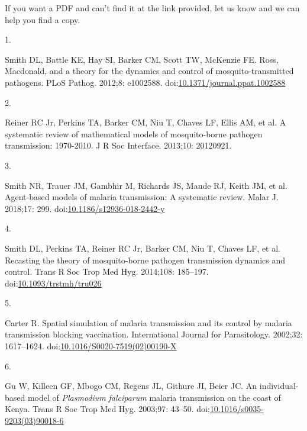 \documentclass[
]{book}
\newlength{\cslhangindent}
\newlength{\csllabelwidth}
\newlength{\cslentryspacingunit} %
\newenvironment{CSLReferences}[2] %
 {%
  \setlength{\parindent}{0pt}
  \ifodd #1
  \let\oldpar\par
  \def\par{\hangindent=\cslhangindent\oldpar}
  \fi
  \setlength{\parskip}{#2\cslentryspacingunit}
 }%
 {}
\newcommand{\CSLLeftMargin}[1]{\parbox[t]{\csllabelwidth}{#1}}
\newcommand{\CSLRightInline}[1]{\parbox[t]{\linewidth - \csllabelwidth}{#1}\break}
\begin{document}
If you want a PDF and can't find it at the link provided, let us know and we can help you find a copy.

\hypertarget{refs}{}
\begin{CSLReferences}{0}{0}
\leavevmode{}%
\CSLLeftMargin{1. }%
\CSLRightInline{Smith DL, Battle KE, Hay SI, Barker CM, Scott TW, McKenzie FE. Ross, {Macdonald}, and a theory for the dynamics and control of mosquito-transmitted pathogens. PLoS Pathog. 2012;8: e1002588. doi:\href{https://doi.org/10.1371/journal.ppat.1002588}{10.1371/journal.ppat.1002588}}

\leavevmode{}%
\CSLLeftMargin{2. }%
\CSLRightInline{Reiner RC Jr, Perkins TA, Barker CM, Niu T, Chaves LF, Ellis AM, et al. A systematic review of mathematical models of mosquito-borne pathogen transmission: 1970-2010. J R Soc Interface. 2013;10: 20120921. }

\leavevmode{}%
\CSLLeftMargin{3. }%
\CSLRightInline{Smith NR, Trauer JM, Gambhir M, Richards JS, Maude RJ, Keith JM, et al. Agent-based models of malaria transmission: {A} systematic review. Malar J. 2018;17: 299. doi:\href{https://doi.org/10.1186/s12936-018-2442-y}{10.1186/s12936-018-2442-y}}

\leavevmode{}%
\CSLLeftMargin{4. }%
\CSLRightInline{Smith DL, Perkins TA, Reiner RC Jr, Barker CM, Niu T, Chaves LF, et al. Recasting the theory of mosquito-borne pathogen transmission dynamics and control. Trans R Soc Trop Med Hyg. 2014;108: 185--197. doi:\href{https://doi.org/10.1093/trstmh/tru026}{10.1093/trstmh/tru026}}

\leavevmode{}%
\CSLLeftMargin{5. }%
\CSLRightInline{Carter R. Spatial simulation of malaria transmission and its control by malaria transmission blocking vaccination. International Journal for Parasitology. 2002;32: 1617--1624. doi:\href{https://doi.org/10.1016/S0020-7519(02)00190-X}{10.1016/S0020-7519(02)00190-X}}

\leavevmode{}%
\CSLLeftMargin{6. }%
\CSLRightInline{Gu W, Killeen GF, Mbogo CM, Regens JL, Githure JI, Beier JC. An individual-based model of {\emph{Plasmodium}} {\emph{falciparum} } malaria transmission on the coast of {Kenya}. Trans R Soc Trop Med Hyg. 2003;97: 43--50. doi:\href{https://doi.org/10.1016/s0035-9203(03)90018-6}{10.1016/s0035-9203(03)90018-6}}


\end{CSLReferences}
\end{document}

